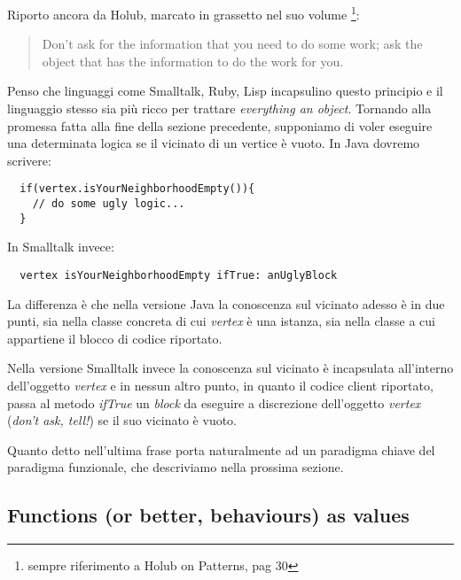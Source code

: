 Riporto ancora da Holub, marcato in grassetto nel suo volume
\footnote{sempre riferimento a Holub on Patterns, pag 30}:
\begin{quotation}
  Don't ask for the information that you need to do some work; ask the
  object that has the information to do the work for you.
\end{quotation}
Penso che linguaggi come Smalltalk, Ruby, Lisp incapsulino questo
principio e il linguaggio stesso sia pi\`u ricco per trattare
\emph{everything an object}. Tornando alla promessa fatta alla fine
della sezione precedente, supponiamo di voler eseguire una determinata
logica se il vicinato di un vertice \`e vuoto. In Java dovremo
scrivere:
\begin{lstlisting}
  if(vertex.isYourNeighborhoodEmpty()){
    // do some ugly logic...
  }
\end{lstlisting}
In Smalltalk invece:
\begin{lstlisting}
  vertex isYourNeighborhoodEmpty ifTrue: anUglyBlock
\end{lstlisting}
La differenza \`e che nella versione Java la conoscenza sul vicinato
adesso \`e in due punti, sia nella classe concreta di cui
\emph{vertex} \`e una istanza, sia nella classe a cui appartiene il
blocco di codice riportato.

Nella versione Smalltalk invece la conoscenza sul vicinato \`e
incapsulata all'interno dell'oggetto \emph{vertex} e in nessun altro
punto, in quanto il codice client riportato, passa al metodo
\emph{ifTrue} un \emph{block} da eseguire a discrezione dell'oggetto
\emph{vertex} (\emph{don't ask, tell!}) se il suo vicinato \`e vuoto.

Quanto detto nell'ultima frase porta naturalmente ad un paradigma
chiave del paradigma funzionale, che descriviamo nella prossima
sezione.

\subsection{Functions (or better, behaviours) as values}

